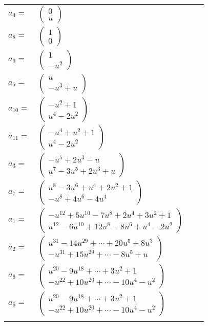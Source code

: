 \documentclass[1p]{elsarticle_modified}
\theoremstyle{definition}
\begin{document}
\begin{tabular}{m{7pt} m{180pt} m{7pt} m{180pt} }
\flushright $a_{4}=$&$\begin{pmatrix}0\\u\end{pmatrix}$ \\
\flushright $a_{8}=$&$\begin{pmatrix}1\\0\end{pmatrix}$ \\
\flushright $a_{9}=$&$\begin{pmatrix}1\\- u^2\end{pmatrix}$ \\
\flushright $a_{5}=$&$\begin{pmatrix}u\\- u^3+u\end{pmatrix}$ \\
\flushright $a_{10}=$&$\begin{pmatrix}- u^2+1\\u^4-2 u^2\end{pmatrix}$ \\
\flushright $a_{11}=$&$\begin{pmatrix}- u^4+u^2+1\\u^4-2 u^2\end{pmatrix}$ \\
\flushright $a_{3}=$&$\begin{pmatrix}- u^5+2 u^3- u\\u^7-3 u^5+2 u^3+u\end{pmatrix}$ \\
\flushright $a_{7}=$&$\begin{pmatrix}u^8-3 u^6+u^4+2 u^2+1\\- u^8+4 u^6-4 u^4\end{pmatrix}$ \\
\flushright $a_{1}=$&$\begin{pmatrix}- u^{12}+5 u^{10}-7 u^8+2 u^4+3 u^2+1\\u^{12}-6 u^{10}+12 u^8-8 u^6+u^4-2 u^2\end{pmatrix}$ \\
\flushright $a_{2}=$&$\begin{pmatrix}u^{31}-14 u^{29}+\cdots+20 u^5+8 u^3\\- u^{31}+15 u^{29}+\cdots-8 u^5+u\end{pmatrix}$ \\
\flushright $a_{6}=$&$\begin{pmatrix}u^{20}-9 u^{18}+\cdots+3 u^2+1\\- u^{22}+10 u^{20}+\cdots-10 u^4- u^2\end{pmatrix}$\\ \flushright $a_{6}=$&$\begin{pmatrix}u^{20}-9 u^{18}+\cdots+3 u^2+1\\- u^{22}+10 u^{20}+\cdots-10 u^4- u^2\end{pmatrix}$\\&\end{tabular}
\end{document}
